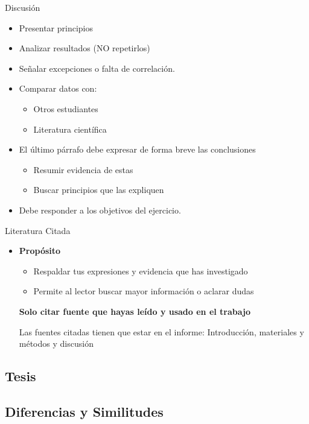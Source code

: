 \documentclass[
11pt, %
]{beamer}
\begin{document}
\begin{frame}{Discusión}
	\begin{itemize}
		\item Presentar principios
		\item Analizar resultados (NO repetirlos)
		\item Señalar excepciones o falta de correlación.
		\item Comparar datos con:
		      \begin{itemize}
			      \item Otros estudiantes
			      \item Literatura científica
		      \end{itemize}
		\item El último párrafo debe expresar de forma breve las conclusiones
		      \begin{itemize}
			      \item Resumir evidencia de estas
			      \item Buscar principios que las expliquen
		      \end{itemize}
		\item Debe responder a los objetivos del ejercicio.
	\end{itemize}
\end{frame}

\begin{frame}{Literatura Citada}
	\begin{itemize}
		\item \textbf{Propósito}
		      \begin{itemize}
			      \item Respaldar tus expresiones y evidencia que has investigado
			      \item Permite al lector buscar mayor información o aclarar dudas
		      \end{itemize}
		      \textbf{Solo citar fuente que hayas leído y usado en el trabajo}

		      Las fuentes citadas tienen que estar en el informe: Introducción, materiales y
		      métodos y discusión
	\end{itemize}
\end{frame}

\subsection{Tesis}

\subsection{Diferencias y Similitudes}
\end{document}
